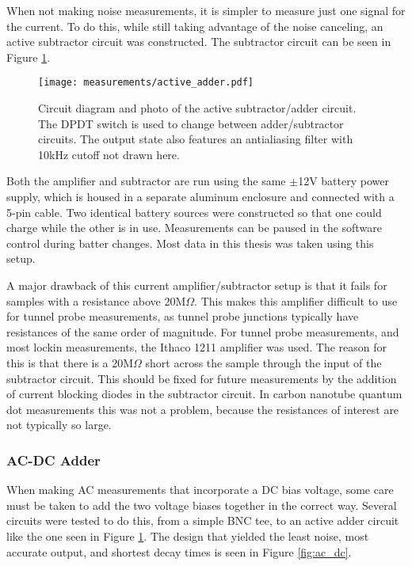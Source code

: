 When not making noise measurements, it is simpler to measure just one signal for the current. To do this, while still taking advantage of the noise canceling, an active subtractor circuit was constructed. The subtractor circuit can be seen in Figure \ref{fig:subtractor}. 

\begin{figure}
    \centering
    \texttt{[image: measurements/active\_adder.pdf]}
    \caption{Circuit diagram and photo of the active subtractor/adder circuit. The DPDT switch is used to change between adder/subtractor circuits. The output state also features an antialiasing filter with 10kHz cutoff not drawn here.}
    \label{fig:subtractor}
\end{figure}

Both the amplifier and subtractor are run using the same $\pm$12V battery power supply, which is housed in a separate aluminum enclosure and connected with a 5-pin cable. Two identical battery sources were constructed so that one could charge while the other is in use. Measurements can be paused in the software control during batter changes. Most data in this thesis was taken using this setup.

A major drawback of this current amplifier/subtractor setup is that it fails for samples with a resistance above 20M$\Omega$. This makes this amplifier difficult to use for tunnel probe measurements, as tunnel probe junctions typically have resistances of the same order of magnitude. For tunnel probe measurements, and most lockin measurements, the Ithaco 1211 amplifier was used. The reason for this is that there is a 20M$\Omega$ short across the sample through the input of the subtractor circuit. This should be fixed for future measurements by the addition of current blocking diodes in the subtractor circuit. In carbon nanotube quantum dot measurements this was not a problem, because the resistances of interest are not typically so large. 

\subsubsection*{AC-DC Adder}
\label{sec:adder}

When making AC measurements that incorporate a DC bias voltage, some care must be taken to add the two voltage biases together in the correct way. Several circuits were tested to do this, from a simple BNC tee, to an active adder circuit like the one seen in Figure \ref{fig:subtractor}. The design that yielded the least noise, most accurate output, and shortest decay times is seen in Figure \ref{fig:ac_dc}.

